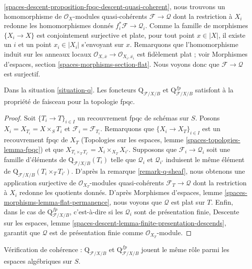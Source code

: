 \begin{remark}
\ref{spaces-descent-proposition-fpqc-descent-quasi-coherent}, nous trouvons un
homomorphisme de $\mathcal{O}_X$-modules quasi-cohérents
$\mathcal{F} \to \mathcal{Q}$ dont la restriction à $X_i$ redonne les
homomorphismes donnés $f_i^*\mathcal{F} \to \mathcal{Q}_i$. Comme la famille
de morphismes $\{X_i \to X\}$ est conjointement surjective et plate, pour
tout point $x \in |X|$, il existe un $i$ et un point $x_i \in |X_i|$
s'envoyant sur $x$. Remarquons que l'homomorphisme induit sur les anneaux
locaux
$\mathcal{O}_{X, \overline{x}} \to \mathcal{O}_{X_i, \overline{x_i}}$
est fidèlement plat ; voir Morphismes d'espaces, section
\ref{spaces-morphisms-section-flat}. Nous voyons donc que
$\mathcal{F} \to \mathcal{Q}$ est surjectif.
\end{remark}

\begin{lemma}
\label{lemma-q-sheaf}
Dans la situation \ref{situation-q}. Les foncteurs
$\text{Q}_{\mathcal{F}/X/B}$ et $\text{Q}^{fp}_{\mathcal{F}/X/B}$ satisfont à
la propriété de faisceau pour la topologie fpqc.
\end{lemma}

\begin{proof}
Soit $\{T_i \to T\}_{i \in I}$ un recouvrement fpqc de schémas sur $S$.
Posons $X_i = X_{T_i} = X \times_S T_i$ et
$\mathcal{F}_i = \mathcal{F}_{T_i}$. Remarquons que
$\{X_i \to X_T\}_{i \in I}$ est un recouvrement fpqc de $X_T$ (Topologies
sur les espaces, lemme \ref{spaces-topologies-lemma-fpqc}) et que
$X_{T_i \times_T T_{i'}} = X_i \times_{X_T} X_{i'}$. Supposons que
$\mathcal{F}_i \to \mathcal{Q}_i$ soit une famille d'éléments de
$\text{Q}_{\mathcal{F}/X/B}(T_i)$ telle que $\mathcal{Q}_i$ et
$\mathcal{Q}_{i'}$ induisent le même élément de
$\text{Q}_{\mathcal{F}/X/B}(T_i \times_T T_{i'})$. D'après la remarque
\ref{remark-q-sheaf}, nous obtenons une application surjective de
$\mathcal{O}_{X_T}$-modules quasi-cohérents
$\mathcal{F}_T \to \mathcal{Q}$ dont la restriction à $X_i$ redonne les
quotients donnés. D'après Morphismes d'espaces, lemme
\ref{spaces-morphisms-lemma-flat-permanence}, nous voyons que $\mathcal{Q}$ est
plat sur $T$. Enfin, dans le cas de $\text{Q}^{fp}_{\mathcal{F}/X/B}$,
c'est-à-dire si les $\mathcal{Q}_i$ sont de présentation finie, Descente sur
les espaces, lemme \ref{spaces-descent-lemma-finite-presentation-descends},
garantit que $\mathcal{Q}$ est de présentation finie comme
$\mathcal{O}_{X_T}$-module.
\end{proof}

\noindent
Vérification de cohérence : $\text{Q}_{\mathcal{F}/X/B}$ et
$\text{Q}^{fp}_{\mathcal{F}/X/B}$ jouent le même rôle parmi les espaces
algébriques sur $S$.

